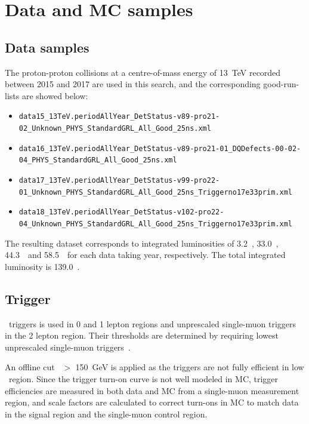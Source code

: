 \chapter{Data and MC samples}
\label{ch:ana-intro}

\section{Data samples}

\par The proton-proton collisions at a centre-of-mass energy of 13~TeV recorded between 2015 and 2017 are used in this search, and the corresponding good-run-lists are showed below:

\begin{itemize}
	\scriptsize
	\item \texttt{data15\_13TeV.periodAllYear\_DetStatus-v89-pro21-02\_Unknown\_PHYS\_StandardGRL\_All\_Good\_25ns.xml}
	\item \texttt{data16\_13TeV.periodAllYear\_DetStatus-v89-pro21-01\_DQDefects-00-02-04\_PHYS\_StandardGRL\_All\_Good\_25ns.xml}
	\item \texttt{data17\_13TeV.periodAllYear\_DetStatus-v99-pro22-01\_Unknown\_PHYS\_StandardGRL\_All\_Good\_25ns\_Triggerno17e33prim.xml}
	\item \texttt{data18\_13TeV.periodAllYear\_DetStatus-v102-pro22-04\_Unknown\_PHYS\_StandardGRL\_All\_Good\_25ns\_Triggerno17e33prim.xml}
\end{itemize}

\par The resulting dataset corresponds to integrated luminosities of 3.2~\ifb, 33.0~\ifb, 44.3~\ifb\ and 58.5~\ifb\ for each data taking year, respectively. 
The total integrated luminosity is 139.0~\ifb.

\section{Trigger}
\label{sec:trigger}

\par \MET~triggers is used in 0 and 1 lepton regions and unprescaled single-muon triggers in the 2 lepton region. 
Their thresholds are determined by requiring lowest unprescaled single-muon triggers~\cite{lowest_unprescaled_triggers}. 

\par An offline cut \MET~$>$ 150~GeV is applied as the triggers are not fully efficient in low \MET~region. Since the trigger turn-on curve is not well modeled in MC,
 trigger efficiencies are measured in both data and MC from a single-muon measurement region, and scale factors are calculated to correct
turn-ons in MC to match data in the signal region and the single-muon control region.

